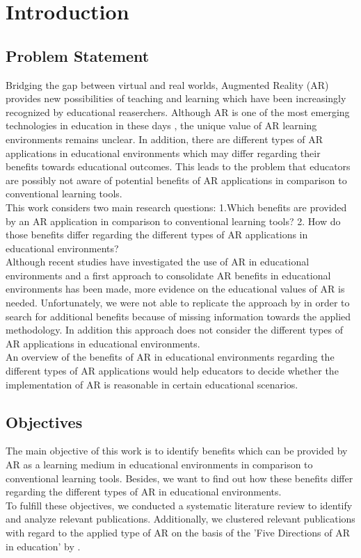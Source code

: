 \section{Introduction}
\subsection{Problem Statement}
Bridging the gap between virtual and real worlds, Augmented Reality (AR) provides new possibilities of teaching and learning which have been increasingly recognized by educational reaserchers. \autocite [cf.][41]{Wu.2013} Although AR is one of the most emerging technologies in education in these days \autocite [cf.][]{Johnson.2010}, the unique value of AR learning environments remains unclear. \autocite [cf.][48]{Wu.2013} In addition, there are different types of AR applications in educational environments which may differ regarding their benefits towards educational outcomes. \autocite [cf.][127-130]{Yuen.2011} This leads to the problem that educators are possibly not aware of potential benefits of AR applications in comparison to conventional learning tools. \\
This work considers two main research questions: 1.Which benefits are provided by an AR application in comparison to conventional learning tools? 2. How do those benefits differ regarding the different types of AR applications in educational environments? \\
Although recent studies have investigated the use of AR in educational environments \autocite {Wu.2013}\mulcit\autocite {Lee.2012} and a first approach to consolidate AR benefits in educational environments has been made, \autocite [cf.][]{Radu.2014} more evidence on the educational values of AR is needed. Unfortunately, we were not able to replicate the approach by \cite{Radu.2014} in order to search for additional benefits because of missing information towards the applied methodology. In addition this approach does not consider the different types of AR applications in educational environments.\\
An overview of the benefits of AR in educational environments regarding the different types of AR applications would help educators to decide whether the implementation of AR is reasonable in certain educational scenarios.\\
\subsection{Objectives}
The main objective of this work is to identify benefits which can be provided by AR as a learning medium in educational environments in comparison to conventional learning tools. Besides, we want to find out how these benefits differ regarding the different types of AR in educational environments. \\
To fulfill these objectives, we conducted a systematic literature review to identify and analyze relevant publications. Additionally, we clustered relevant publications with regard to the applied type of AR on the basis of the 'Five Directions of AR in education' by \cite{Yuen.2011}.
